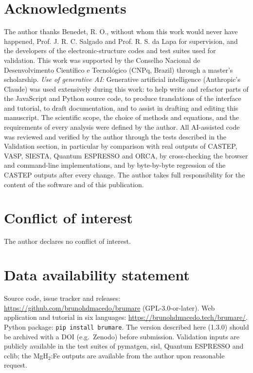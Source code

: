 \documentclass[11pt,a4paper]{article}
\begin{document}
\section*{Acknowledgments}
The author thanks Benedet, R. O., without whom this work would never have happened, Prof. J. R. C. Salgado and Prof. R. S. da Lapa for supervision, and the developers of the electronic-structure codes and test suites used for validation. This work was supported by the Conselho Nacional de Desenvolvimento Cient\'ifico e Tecnol\'ogico (CNPq, Brazil) through a master's scholarship. \textit{Use of generative AI:} %
Generative artificial intelligence (Anthropic's Claude) was used extensively during this work: to help write and refactor parts of the JavaScript and Python source code, to produce translations of the interface and tutorial, to draft documentation, and to assist in drafting and editing this manuscript. The scientific scope, the choice of methods and equations, and the requirements of every analysis were defined by the author. All AI-assisted code was reviewed and verified by the author through the tests described in the Validation section, in particular by comparison with real outputs of CASTEP, VASP, SIESTA, Quantum ESPRESSO and ORCA, by cross-checking the browser and command-line implementations, and by byte-by-byte regression of the CASTEP outputs after every change. The author takes full responsibility for the content of the software and of this publication.

\section*{Conflict of interest}The author declares no conflict of interest.
\section*{Data availability statement}Source code, issue tracker and releases: \url{https://github.com/brunohdmacedo/brumare} (GPL-3.0-or-later). Web application and tutorial in six languages: \url{https://brunohdmacedo.tech/brumare/}. Python package: \texttt{pip install brumare}. The version described here (1.3.0) should be archived with a DOI (e.g.\ Zenodo) before submission. Validation inputs are publicly available in the test suites of pymatgen, sisl, Quantum ESPRESSO and cclib; the MgH$_2$:Fe outputs are available from the author upon reasonable request.
\appendix



\end{document}

